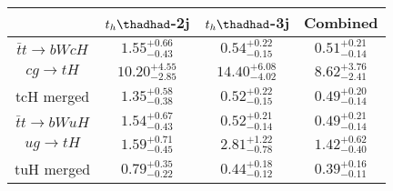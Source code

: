 \centering
\begin{tabular}{|c|c|c|c|} \hline
 & $t_h\thadhad$-2j & $t_h\thadhad$-3j & Combined\\\hline
$\bar{t}t\to bWcH$ & $1.55^{+0.66}_{-0.43}$ & $0.54^{+0.22}_{-0.15}$ & $0.51^{+0.21}_{-0.14}$\\\hline
$cg\to tH$ & $10.20^{+4.55}_{-2.85}$ & $14.40^{+6.08}_{-4.02}$ & $8.62^{+3.76}_{-2.41}$\\\hline
tcH merged & $1.35^{+0.58}_{-0.38}$ & $0.52^{+0.22}_{-0.15}$ & $0.49^{+0.20}_{-0.14}$\\\hline
$\bar{t}t\to bWuH$ & $1.54^{+0.67}_{-0.43}$ & $0.52^{+0.21}_{-0.14}$ & $0.49^{+0.21}_{-0.14}$\\\hline
$ug\to tH$ & $1.59^{+0.71}_{-0.45}$ & $2.81^{+1.22}_{-0.78}$ & $1.42^{+0.62}_{-0.40}$\\\hline
tuH merged & $0.79^{+0.35}_{-0.22}$ & $0.44^{+0.18}_{-0.12}$ & $0.39^{+0.16}_{-0.11}$\\\hline
\end{tabular}